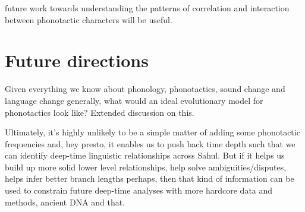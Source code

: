 future work towards understanding the patterns of correlation and interaction between phonotactic characters will be useful.

\hypertarget{future-directions}{%
\section{Future directions}\label{future-directions}}

Given everything we know about phonology, phonotactics, sound change and language change generally, what would an ideal evolutionary model for phonotactics look like? Extended discussion on this.

Ultimately, it's highly unlikely to be a simple matter of adding some phonotactic frequencies and, hey presto, it enables us to push back time depth such that we can identify deep-time linguistic relationships across Sahul. But if it helps us build up more solid lower level relationships, help solve ambiguities/disputes, helps infer better branch lengths perhaps, then that kind of information can be used to constrain future deep-time analyses with more hardcore data and methods, ancient DNA and that.
